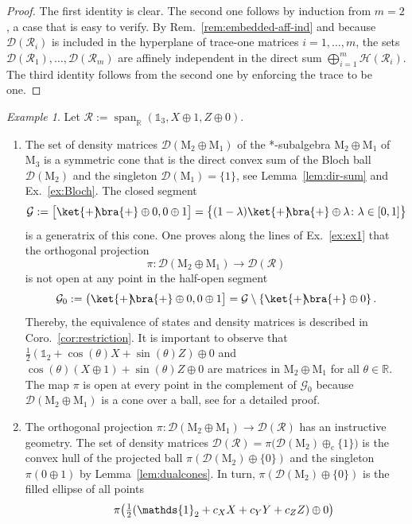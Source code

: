 \documentclass[a4paper,11pt,reqno]{amsart}
\newcommand{\R}{\mathbb{R}}
\newcommand{\M}{\mathrm{M}}
\newcommand{\cD}{\mathcal{D}}
\newcommand{\cG}{\mathcal{G}}
\newcommand{\cH}{\mathcal{H}}
\newcommand{\cR}{\mathcal{R}}
\newcommand{\id}{\mathds{1}}
\newcommand{\dcs}{\oplus_\mathrm{c}}
\DeclareMathOperator\spn{span}
\theoremstyle{definition}
\theoremstyle{remark}
\newtheorem{exa}[thm]{Example}
\numberwithin{equation}{section}
\begin{document}
%
\begin{proof}
The first identity is clear. The second one follows by induction from $m=2$,
a case that is easy to verify. By Rem.~\ref{rem:embedded-aff-ind} and because 
$\cD(\cR_i)$ is included in the hyperplane of trace-one matrices $i=1,\dots,m$, 
the sets $\cD(\cR_1),\dots,\cD(\cR_m)$ are affinely independent in the direct 
sum $\bigoplus_{i=1}^m\cH(\cR_i)$. The third identity follows from the second 
one by enforcing the trace to be one. 
\end{proof}
%
\begin{exa}\label{ex:ex1b1}
Let $\cR:=\spn_\R(\id_3,X\oplus 1,Z\oplus 0)$.
\begin{enumerate}
\item[a)] 
The set of density matrices $\cD(\M_2\oplus\M_1)$ of the *-sub\-al\-ge\-bra 
$\M_2\oplus\M_1$ of $\M_3$ is a symmetric cone that is the direct convex 
sum of the Bloch ball $\cD(\M_2)$ and the singleton $\cD(\M_1)=\{1\}$, see 
Lemma~\ref{lem:dir-sum} and Ex.~\ref{ex:Bloch}. The closed segment 
\[\textstyle
\cG:=
\big[\ket{+}\!\!\bra{+}\oplus0,0\oplus 1\big]
=\big\{(1-\lambda)\ket{+}\!\!\bra{+}\oplus\lambda
 \colon \lambda\in[0,1] \big\}
\] 
is a generatrix of this cone. 
One proves along the lines of Ex.~\ref{ex:ex1} that the orthogonal projection 
\[\textstyle
\pi:\cD(\M_2\oplus\M_1)\to\cD(\cR)
\]
is not open at any point in the half-open segment 
\[\textstyle
\cG_0
:=\big(\ket{+}\!\!\bra{+}\oplus0,0\oplus 1\big]
=\cG\setminus\{\ket{+}\!\!\bra{+}\oplus 0\}\,.
\] 
Thereby, the equivalence of states and density matrices is described in 
Coro.~\ref{cor:restriction}. It is important to observe that 
$\frac{1}{2}(\id_2+\cos(\theta)X+\sin(\theta)Z)\oplus 0$ and 
$\cos(\theta)(X\oplus 1)+\sin(\theta)Z\oplus 0$ are matrices in $\M_2\oplus\M_1$ 
for all $\theta\in\R$. The map $\pi$ is open at every point in the complement 
of $\cG_0$ because $\cD(\M_2\oplus\M_1)$ is a cone over a ball, see
\cite[Lemma~4.17]{Weis2014} for a detailed proof.
%
\item[b)]
The orthogonal projection $\pi:\cD(\M_2\oplus\M_1)\to\cD(\cR)$ has an
instructive geometry. The set of density matrices
$\cD(\cR)=\pi\big(\cD(\M_2)\dcs\{1\}\big)$ is the convex hull of the 
projected ball $\pi(\cD(\M_2)\oplus\{0\})$ and the singleton 
$\pi(0\oplus 1)$ by Lemma~\ref{lem:dualcones}. In turn, 
$\pi(\cD(\M_2)\oplus\{0\})$ is the filled ellipse of all points
\begin{align}
\label{eq:piR}
&\textstyle 
\hphantom{{}={}}\pi\big(\frac{1}{2}(\id_2+c_XX+c_YY+c_ZZ)\oplus 0\big)\\

\end{align}
\end{enumerate}
\end{exa}
\end{document}
